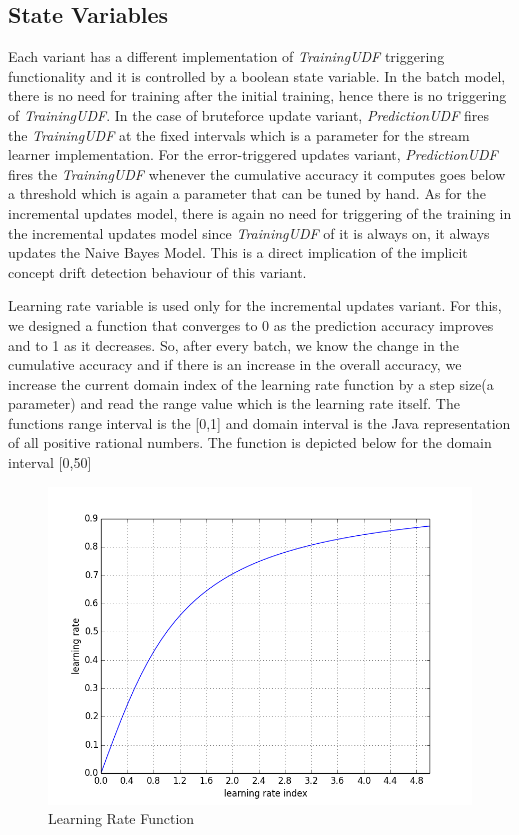 \documentclass{article} %
\begin{document}
\subsection{State Variables}
Each variant has a different implementation of \textit{TrainingUDF} triggering functionality and it is controlled by a boolean state variable. In the batch model, there is no need for training after the initial training, hence there is no triggering of \textit{TrainingUDF}. 
In the case of bruteforce update variant, \textit{PredictionUDF} fires the \textit{TrainingUDF} at the fixed intervals which is a parameter for the stream learner implementation. For the error-triggered updates variant, \textit{PredictionUDF} fires the \textit{TrainingUDF} whenever the cumulative accuracy it computes goes below a threshold which is again a parameter that can be tuned by hand. As for the incremental updates model, there is again no need for triggering of the training in the incremental updates model since \textit{TrainingUDF} of it is always on, it always updates the Naive Bayes Model. This is a direct implication of the implicit concept drift detection behaviour of this variant.

Learning rate variable is used only for the incremental updates variant. For this, we designed a function that converges to 0 as the prediction accuracy improves and to 1 as it decreases. So, after every batch, we know the change in the cumulative accuracy and if there is an increase in the overall accuracy, we increase the current domain index of the learning rate function by a step size(a parameter) and read the range value which is the learning rate itself. The functions range interval is the [0,1] and domain interval is the Java representation of all positive rational numbers. The function is depicted below for the domain interval [0,50]

\begin{figure}[htbp]
  \centering
  \includegraphics[scale=0.54]{./figures/learning_rate_function.png}
  \caption{Learning Rate Function}
\end{figure}
\end{document}
